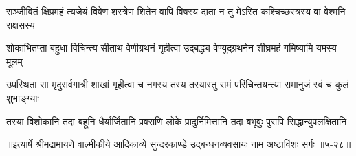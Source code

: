 \twolineshloka
{सञ्जीवितं क्षिप्रमहं त्यजेयं विषेण शस्त्रेण शितेन वापि}
{विषस्य दाता न तु मेऽस्ति कश्चिच्छस्त्रस्य वा वेश्मनि राक्षसस्य} %

\twolineshloka
{शोकाभितप्ता बहुधा विचिन्त्य सीताथ वेणीग्रथनं गृहीत्वा}
{उद्बद्ध्य वेण्युद्ग्रथनेन शीघ्रमहं गमिष्यामि यमस्य मूलम्} %

\twolineshloka
{उपस्थिता सा मृदुसर्वगात्री शाखां गृहीत्वा च नगस्य तस्य}
{तस्यास्तु रामं परिचिन्तयन्त्या रामानुजं स्वं च कुलं शुभाङ्ग्याः} %

\twolineshloka
{तस्या विशोकानि तदा बहूनि धैर्यार्जितानि प्रवराणि लोके}
{प्रादुर्निमित्तानि तदा बभूवुः पुरापि सिद्धान्युपलक्षितानि} %


॥इत्यार्षे श्रीमद्रामायणे वाल्मीकीये आदिकाव्ये सुन्दरकाण्डे उद्बन्धनव्यवसायः नाम अष्टाविंशः सर्गः ॥५-२८॥
